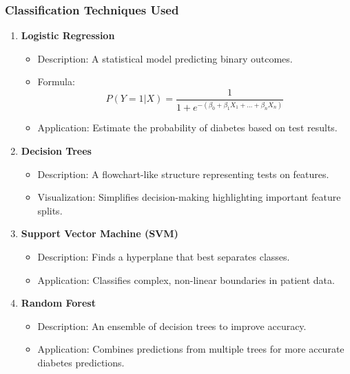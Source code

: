\documentclass[aspectratio=169]{beamer}
\begin{document}
\begin{frame}[fragile]
    \frametitle{Classification Techniques Used}
    \begin{enumerate}
        \item \textbf{Logistic Regression}
        \begin{itemize}
            \item Description: A statistical model predicting binary outcomes.
            \item Formula:
            \begin{equation}
            P(Y=1|X) = \frac{1}{1 + e^{-(\beta_0 + \beta_1X_1 + \ldots + \beta_nX_n)}}
            \end{equation}
            \item Application: Estimate the probability of diabetes based on test results.
        \end{itemize}
        
        \item \textbf{Decision Trees}
        \begin{itemize}
            \item Description: A flowchart-like structure representing tests on features.
            \item Visualization: Simplifies decision-making highlighting important feature splits.
        \end{itemize}
        
        \item \textbf{Support Vector Machine (SVM)}
        \begin{itemize}
            \item Description: Finds a hyperplane that best separates classes.
            \item Application: Classifies complex, non-linear boundaries in patient data.
        \end{itemize}
        
        \item \textbf{Random Forest}
        \begin{itemize}
            \item Description: An ensemble of decision trees to improve accuracy.
            \item Application: Combines predictions from multiple trees for more accurate diabetes predictions.
        \end{itemize}
    \end{enumerate}
\end{frame}
\end{document}
